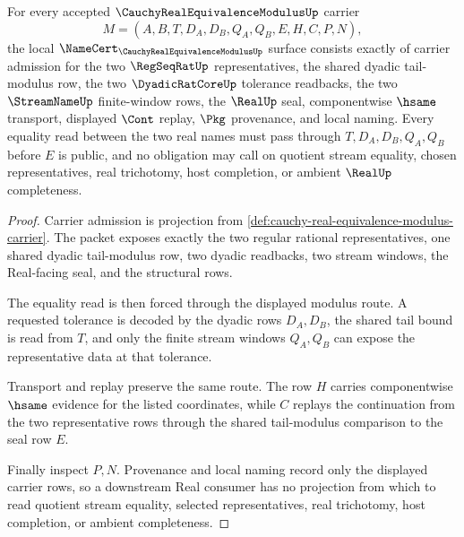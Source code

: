 \begin{theorem}
\label{thm:cauchy-real-equivalence-modulus-namecert-obligations}
For every accepted $\CauchyRealEquivalenceModulusUp$ carrier
$$
M=(A,B,T,D_A,D_B,Q_A,Q_B,E,H,C,P,N),
$$
the local $\NameCert_{\CauchyRealEquivalenceModulusUp}$ surface consists exactly of carrier admission for the two $\RegSeqRatUp$ representatives, the shared dyadic tail-modulus row, the two $\DyadicRatCoreUp$ tolerance readbacks, the two $\StreamNameUp$ finite-window rows, the $\RealUp$ seal, componentwise $\hsame$ transport, displayed $\Cont$ replay, $\Pkg$ provenance, and local naming. Every equality read between the two real names must pass through $T,D_A,D_B,Q_A,Q_B$ before $E$ is public, and no obligation may call on quotient stream equality, chosen representatives, real trichotomy, host completion, or ambient $\RealUp$ completeness.
\end{theorem}
\begin{proof}
Carrier admission is projection from \autoref{def:cauchy-real-equivalence-modulus-carrier}. The packet exposes exactly the two regular rational representatives, one shared dyadic tail-modulus row, two dyadic readbacks, two stream windows, the Real-facing seal, and the structural rows.

The equality read is then forced through the displayed modulus route. A requested tolerance is decoded by the dyadic rows $D_A,D_B$, the shared tail bound is read from $T$, and only the finite stream windows $Q_A,Q_B$ can expose the representative data at that tolerance.

Transport and replay preserve the same route. The row $H$ carries componentwise $\hsame$ evidence for the listed coordinates, while $C$ replays the continuation from the two representative rows through the shared tail-modulus comparison to the seal row $E$.

Finally inspect $P,N$. Provenance and local naming record only the displayed carrier rows, so a downstream Real consumer has no projection from which to read quotient stream equality, selected representatives, real trichotomy, host completion, or ambient completeness.
\end{proof}

